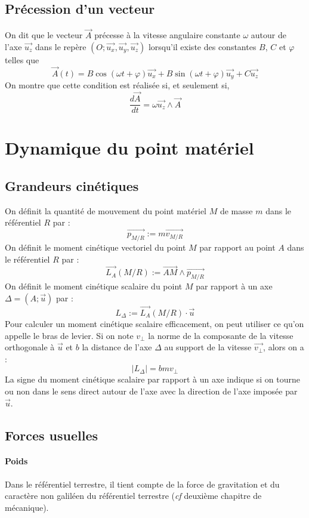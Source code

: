 \documentclass[french]{book}
\theoremstyle{plain}
\theoremstyle{definition}
\theoremstyle{remark}
\begin{document}
\subsection{Précession d'un vecteur}
On dit que le vecteur $\overrightarrow{A}$ précesse à la vitesse angulaire constante $\omega$ autour de l'axe $\overrightarrow{u_z}$ dans le repère $(O;\overrightarrow{u_x},\overrightarrow{u_y},\overrightarrow{u_z})$ lorsqu'il existe des constantes $B$, $C$ et $\varphi$ telles que $$\overrightarrow{A}(t)=B\cos(\omega t+\varphi)\overrightarrow{u_x}+B\sin(\omega t+\varphi)\overrightarrow{u_y}+C\overrightarrow{u_z}$$
On montre que cette condition est réalisée si, et seulement si, $$\frac{d\overrightarrow{A}}{dt}=\omega\overrightarrow{u_z}\wedge\overrightarrow{A}$$

\section{Dynamique du point matériel}
\subsection{Grandeurs cinétiques}
On définit la quantité de mouvement du point matériel $M$ de masse $m$ dans le référentiel  $R$ par : $$\overrightarrow{p_{M/R}}:=m\overrightarrow{v_{M/R}}$$ On définit le moment cinétique vectoriel du point $M$ par rapport au point $A$ dans le référentiel $R$ par : $$\overrightarrow{L_A}(M/R):=\overrightarrow{AM}\wedge\overrightarrow{p_{M/R}}$$
On définit le moment cinétique scalaire du point $M$ par rapport à un axe $\Delta=(A;\overrightarrow{u})$ par : $$L_\Delta:=\overrightarrow{L_A}(M/R)\cdot\overrightarrow{u}$$ Pour calculer un moment cinétique scalaire efficacement, on peut utiliser ce qu'on appelle le bras de levier. Si on note $v_\bot$ la norme de la composante de la vitesse orthogonale à $\overrightarrow{u}$ et $b$ la distance de l'axe $\Delta$ au support de la vitesse $\overrightarrow{v_\bot}$, alors on a : $$\lvert L_\Delta\rvert = bmv_\bot$$ La signe du moment cinétique scalaire par rapport à un axe indique si on tourne ou non dans le sens direct autour de l'axe avec la direction de l'axe imposée par $\overrightarrow{u}$.
\subsection{Forces usuelles}
\paragraph{Poids} Dans le référentiel terrestre, il tient compte de la force de gravitation et du caractère non galiléen du référentiel terrestre (\textit{cf} deuxième chapitre de mécanique).
\end{document}
